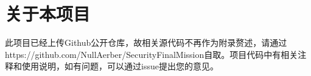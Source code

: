 \section*{关于本项目}
此项目已经上传Github公开仓库，故相关源代码不再作为附录赘述，请通过https://github.com/NullAerber/SecurityFinalMission自取。项目代码中有相关注释和使用说明，如有问题，可以通过issue提出您的意见。
